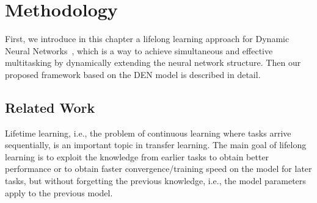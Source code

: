 \chapter{Methodology}
\label{chap:framework}
First, we introduce in this chapter a lifelong learning approach for Dynamic Neural Networks~\cite{yoon2017lifelong}, which is a way to achieve simultaneous and effective multitasking by dynamically extending the neural network structure. Then our proposed framework based on the DEN model is described in detail.


\section{Related Work}\label{sec:related-4}

Lifetime learning, i.e., the problem of continuous learning where tasks arrive sequentially, is an important topic in transfer learning. The main goal of lifelong learning is to exploit the knowledge from earlier tasks to obtain better performance or to obtain faster convergence/training speed on the model for later tasks, but without forgetting the previous knowledge, i.e., the model parameters apply to the previous model.

